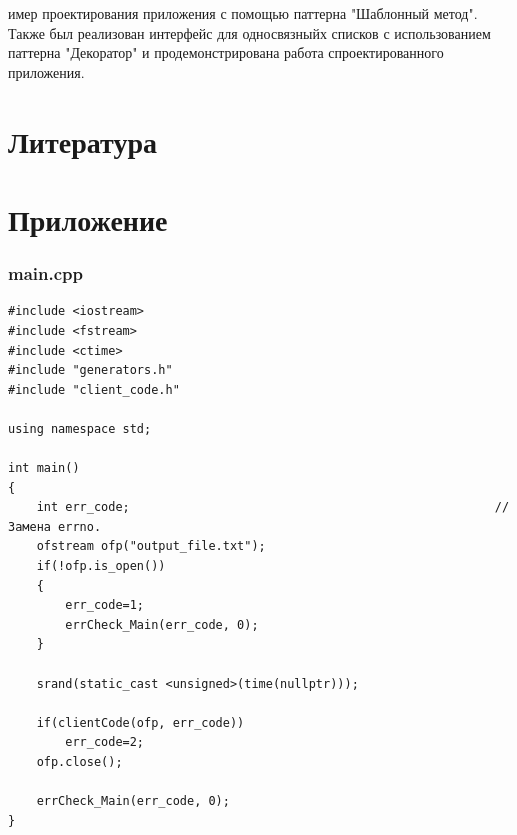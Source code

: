 \documentclass[a4paper,14pt]{article}
\begin{document}
имер проектирования приложения с помощью паттерна "Шаблонный метод". Также был реализован интерфейс для односвязныйх списков с использованием паттерна "Декоратор" и продемонстрирована работа спроектированного приложения.
\newpage

\section{Литература}

\printbibliography

\clearpage

\section{Приложение}
\subsubsection{main.cpp}
\begin{verbatim}
#include <iostream>
#include <fstream>
#include <ctime>
#include "generators.h"
#include "client_code.h"

using namespace std;

int main()
{
    int err_code;                                                   // Замена errno.
    ofstream ofp("output_file.txt");
    if(!ofp.is_open())
    {
        err_code=1;
        errCheck_Main(err_code, 0);
    }

    srand(static_cast <unsigned>(time(nullptr)));

    if(clientCode(ofp, err_code))
        err_code=2;
    ofp.close();

    errCheck_Main(err_code, 0);
}

\end{verbatim}
\end{document}
